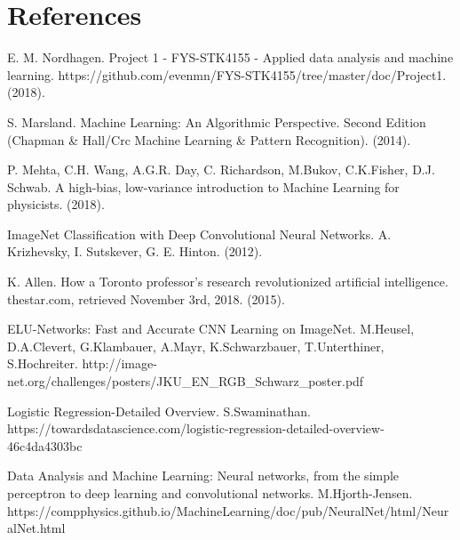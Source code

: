 \newpage
\section{References}

\begingroup
\renewcommand{\section}[2]{}
\begin{thebibliography}{}
	E. M. Nordhagen.
	Project 1 - FYS-STK4155 - Applied data analysis and machine learning.
	https://github.com/evenmn/FYS-STK4155/tree/master/doc/Project1.
	(2018).
	
	S. Marsland.
	Machine Learning: An Algorithmic Perspective. Second Edition (Chapman \& Hall/Crc Machine Learning \& Pattern Recognition).
	(2014).
	
	P. Mehta, C.H. Wang, A.G.R. Day, C. Richardson, M.Bukov, C.K.Fisher, D.J. Schwab.
	A high-bias, low-variance introduction to Machine Learning for physicists.
	(2018).
	
	ImageNet Classification with Deep Convolutional Neural Networks.
	A. Krizhevsky, I. Sutskever, G. E. Hinton.
	(2012).
	
	K. Allen.
	How a Toronto professor’s research revolutionized artificial intelligence.
	thestar.com, retrieved November 3rd, 2018.
	(2015).
	
	ELU-Networks: Fast and Accurate CNN Learning on ImageNet.
	M.Heusel, D.A.Clevert, G.Klambauer, A.Mayr, K.Schwarzbauer, T.Unterthiner, S.Hochreiter.
	http://image-net.org/challenges/posters/JKU\_EN\_RGB\_Schwarz\_poster.pdf
	
	Logistic Regression-Detailed Overview.
	S.Swaminathan.
	https://towardsdatascience.com/logistic-regression-detailed-overview-46c4da4303bc
	
	Data Analysis and Machine Learning: Neural networks, from the simple perceptron to deep learning and convolutional networks.
	M.Hjorth-Jensen.
	https://compphysics.github.io/MachineLearning/doc/pub/NeuralNet/html/NeuralNet.html
	
\end{thebibliography}
\endgroup